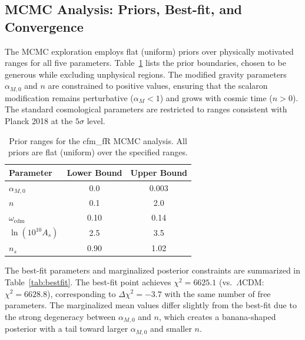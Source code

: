 \documentclass[aps,prd,twocolumn,superscriptaddress,nofootinbib]{revtex4-2}
\begin{document}
\subsection{MCMC Analysis: Priors, Best-fit, and Convergence}
\label{subsec:mcmc_details}

The MCMC exploration employs flat (uniform) priors over physically motivated ranges for all five parameters. Table~\ref{tab:priors} lists the prior boundaries, chosen to be generous while excluding unphysical regions. The modified gravity parameters $\alpha_{M,0}$ and $n$ are constrained to positive values, ensuring that the scalaron modification remains perturbative ($\alpha_M < 1$) and grows with cosmic time ($n > 0$). The standard cosmological parameters are restricted to ranges consistent with Planck 2018 at the $5\sigma$ level.

\begin{table}[h]
\centering
\caption{Prior ranges for the cfm\_fR MCMC analysis. All priors are flat (uniform) over the specified ranges.}
\label{tab:priors}
\begin{tabular}{lcc}
\toprule
\textbf{Parameter} & \textbf{Lower Bound} & \textbf{Upper Bound} \\
\midrule
$\alpha_{M,0}$ & 0.0 & 0.003 \\
$n$ & 0.1 & 2.0 \\
$\omega_{\mathrm{cdm}}$ & 0.10 & 0.14 \\
$\ln(10^{10}A_s)$ & 2.5 & 3.5 \\
$n_s$ & 0.90 & 1.02 \\
\bottomrule
\end{tabular}
\end{table}

The best-fit parameters and marginalized posterior constraints are summarized in Table~\ref{tab:bestfit}. The best-fit point achieves $\chi^2 = 6625.1$ (vs.\ $\Lambda$CDM: $\chi^2 = 6628.8$), corresponding to $\Delta\chi^2 = -3.7$ with the same number of free parameters. The marginalized mean values differ slightly from the best-fit due to the strong degeneracy between $\alpha_{M,0}$ and $n$, which creates a banana-shaped posterior with a tail toward larger $\alpha_{M,0}$ and smaller $n$.
\end{document}
